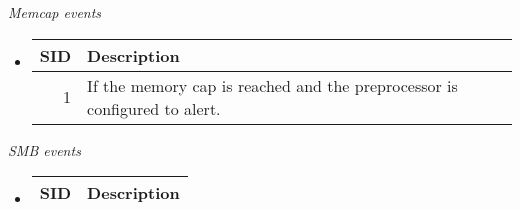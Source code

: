\documentclass[english]{report}
\begin{document}
\textit{Memcap events}
\begin{itemize}
\item[]

\begin{longtable}{|r|p{13.5cm}|}

\hline
SID & Description\\
\hline

\hline
  1 &

If the memory cap is reached and the preprocessor is configured to alert.\\

\hline
\end{longtable}
\end{itemize}

\textit{SMB events}
\begin{itemize}

\item[]
\begin{longtable}{|r|p{13.5cm}|}

\hline
SID & Description\\
\hline


\end{longtable}
\end{itemize}
\end{document}

